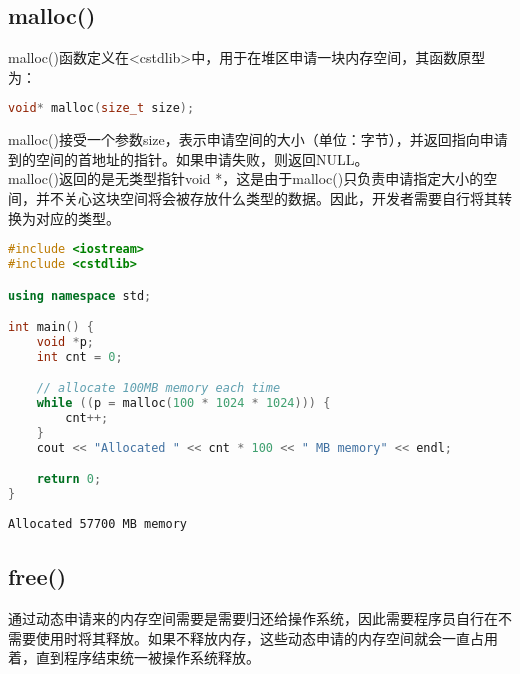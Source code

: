 \subsection{malloc()}

malloc()函数定义在<cstdlib>中，用于在堆区申请一块内存空间，其函数原型为：

\vspace{-0.5cm}

\begin{lstlisting}[language=C++]
void* malloc(size_t size);
\end{lstlisting}

malloc()接受一个参数size，表示申请空间的大小（单位：字节），并返回指向申请到的空间的首地址的指针。如果申请失败，则返回NULL。\\

malloc()返回的是无类型指针void *，这是由于malloc()只负责申请指定大小的空间，并不关心这块空间将会被存放什么类型的数据。因此，开发者需要自行将其转换为对应的类型。\\


\begin{lstlisting}[language=C++]
#include <iostream>
#include <cstdlib>

using namespace std;

int main() {
    void *p;
    int cnt = 0;

    // allocate 100MB memory each time
    while ((p = malloc(100 * 1024 * 1024))) {
        cnt++;
    }
    cout << "Allocated " << cnt * 100 << " MB memory" << endl;

    return 0;
}
\end{lstlisting}

\begin{tcolorbox}
    \begin{verbatim}
Allocated 57700 MB memory
	\end{verbatim}
\end{tcolorbox}

\vspace{0.5cm}

\subsection{free()}

通过动态申请来的内存空间需要是需要归还给操作系统，因此需要程序员自行在不需要使用时将其释放。如果不释放内存，这些动态申请的内存空间就会一直占用着，直到程序结束统一被操作系统释放。\\

